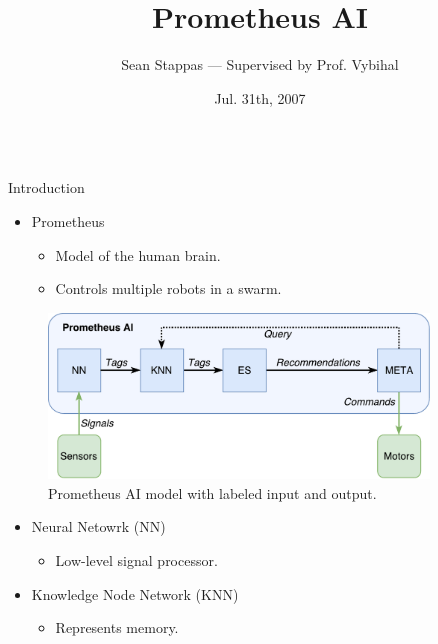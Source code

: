 \documentclass[final]{beamer} %
\title[Fancy Posters]{Prometheus AI}
\author{Sean Stappas --- Supervised by Prof. Vybihal}
\institute[RWTH Aachen University]{}
\date{Jul. 31th, 2007}
\newlength{\columnheight}
\begin{document}
	\begin{frame}
		\begin{columns}
			\begin{column}{.3\textwidth}
				\parbox[t][\columnheight]{\textwidth}{
				\begin{block}{Introduction}
					\begin{itemize}
						\item Prometheus
						\begin{itemize}
							\item Model of the human brain.
							\item Controls multiple robots in a swarm.
						\end{itemize}
					\end{itemize}
				
					\begin{figure}[!htb]
						\includegraphics[width=0.9\textwidth]{figures/ai_model_labeled.pdf}
						\caption{Prometheus AI model with labeled input and output.}
						\label{model_labeled}
					\end{figure}
						
					\begin{itemize}
						\item Neural Netowrk (NN)
						\begin{itemize}
							\item Low-level signal processor.
						\end{itemize}
					\end{itemize}
					
					\begin{itemize}
						\item Knowledge Node Network (KNN)
						\begin{itemize}
							\item Represents memory.
						\end{itemize}
					\end{itemize}
					

\end{block}}
\end{column}
\end{columns}
\end{frame}
\end{document}
